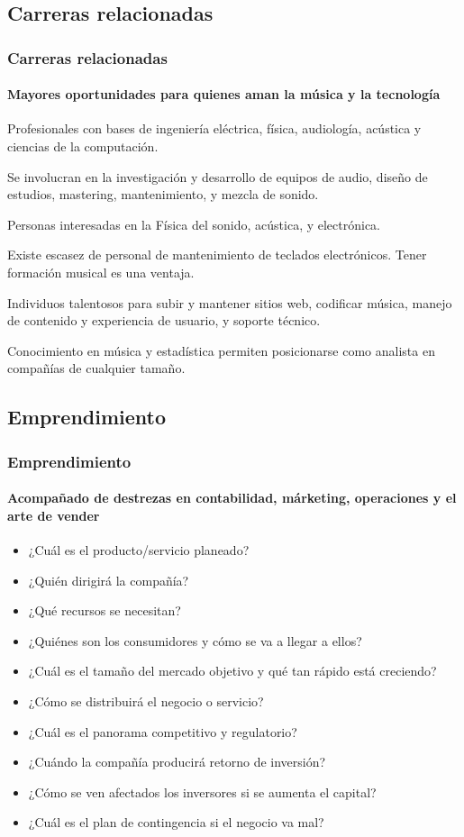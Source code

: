 \documentclass[xcolor=table]{beamer}
\begin{document}
	\subsection{Carreras relacionadas}
	\begin{frame}[allowframebreaks]
    		\frametitle{Carreras relacionadas}
		\framesubtitle{Mayores oportunidades para quienes aman la música y la tecnología}
		\begin{tcolorbox}[colback=white,colframe=udlacolour,title=Ingenierio de audio]
    			Profesionales con bases de ingeniería eléctrica, física, audiología, acústica y ciencias de la computación.
    		\end{tcolorbox}
		
		Se involucran en la investigación y desarrollo de equipos de audio, diseño de estudios, mastering, mantenimiento, y mezcla de sonido.
		\begin{tcolorbox}[colback=white,colframe=udlacolour,title=Inventores/Reparadores de instrumentos]
    			Personas interesadas en la Física del sonido, acústica, y electrónica.
    		\end{tcolorbox} 
		Existe escasez de personal de mantenimiento de teclados electrónicos. Tener formación musical es una ventaja.
		
		\begin{tcolorbox}[colback=white,colframe=udlacolour,title=Desarrolladores de música en línea]
    			Individuos talentosos para subir y mantener sitios web, codificar música, manejo de contenido y experiencia de usuario, y soporte técnico.
    		\end{tcolorbox}
		Conocimiento en música y estadística permiten posicionarse como analista en compañías de cualquier tamaño.
	\end{frame}
	\subsection{Emprendimiento}
	\begin{frame}
		\frametitle{Emprendimiento}
		\framesubtitle{Acompañado de destrezas en contabilidad, márketing, operaciones y el arte de vender}
		\begin{itemize}
			\item ¿Cuál es el producto/servicio planeado?~\cite{ries2018lean}
			\item ¿Quién dirigirá la compañía?
			\item ¿Qué recursos se necesitan?
			\item ¿Quiénes son los consumidores y cómo se va a llegar a ellos?
			\item ¿Cuál es el tamaño del mercado objetivo y qué tan rápido está creciendo?
			\item ¿Cómo se distribuirá el negocio o servicio?
			\item ¿Cuál es el panorama competitivo y regulatorio?
			\item ¿Cuándo la compañía producirá retorno de inversión?
			\item ¿Cómo se ven afectados los inversores si se aumenta el capital?
			\item ¿Cuál es el plan de contingencia si el negocio va mal?
		\end{itemize}
	\end{frame}
\end{document}

